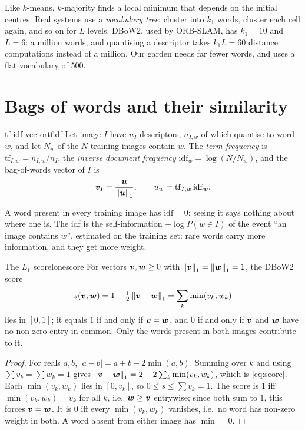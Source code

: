 Like $k$-means, $k$-majority finds a local minimum that depends on the
initial centres. Real systems use a \emph{vocabulary tree}: cluster
into $k_1$ words, cluster each cell again, and so on for $L$ levels.
DBoW2, used by ORB-SLAM, has $k_1=10$ and $L=6$: a million words, and
quantising a descriptor takes $k_1L=60$ distance computations instead
of a million. Our garden needs far fewer words, and 
uses a flat vocabulary of 500.

\section{Bags of words and their similarity}

\begin{definition}{tf-idf vector}{tfidf}
Let image $I$ have $n_I$ descriptors, $n_{I,w}$ of which quantise to
word $w$, and let $N_w$ of the $N$ training images contain $w$. The
\emph{term frequency} is $\mathrm{tf}_{I,w}=n_{I,w}/n_I$, the
\emph{inverse document frequency} $\mathrm{idf}_w=\log(N/N_w)$, and the
bag-of-words vector of $I$ is
\begin{equation}\label{eq:tfidf}
\bm{v}_I=\frac{\bm{u}}{\left\lVert \bm{u}\right\rVert_1},\qquad
u_w=\mathrm{tf}_{I,w}\,\mathrm{idf}_w .
\end{equation}
\end{definition}

A word present in every training image has $\mathrm{idf}=0$: seeing it
says nothing about where one is. The idf is the self-information
$-\log P(w\in I)$ of the event ``an image contains $w$'', estimated on
the training set: rare words carry more information, and they get more
weight.

\begin{proposition}{The $L_1$ score}{lonescore}
For vectors $\bm{v},\bm{w}\ge0$ with $\left\lVert \bm{v}\right\rVert_1=
\left\lVert \bm{w}\right\rVert_1=1$, the DBoW2 score
\begin{equation}\label{eq:score}
s(\bm{v},\bm{w})=1-\tfrac12\left\lVert \bm{v}-\bm{w}\right\rVert_1
=\sum_{k}\min(v_k,w_k)
\end{equation}
lies in $[0,1]$; it equals $1$ if and only if $\bm{v}=\bm{w}$, and
$0$ if and only if $\bm{v}$ and $\bm{w}$ have no non-zero entry in
common. Only the words present in both images contribute to it.
\end{proposition}

\begin{proof}
For reals $a,b$, $|a-b|=a+b-2\min(a,b)$. Summing over $k$ and using
$\sum v_k=\sum w_k=1$ gives $\left\lVert \bm{v}-\bm{w}\right\rVert_1=2-2\sum_k
\min(v_k,w_k)$, which is \eqref{eq:score}. Each $\min(v_k,w_k)$ lies in
$[0,v_k]$, so $0\le s\le\sum v_k=1$. The score
is $1$ iff $\min(v_k,w_k)=v_k$ for all $k$, i.e.\ $\bm{w}\ge\bm{v}$
entrywise; since both sum to $1$, this forces $\bm{v}=\bm{w}$. It is
$0$ iff every $\min(v_k,w_k)$ vanishes, i.e.\ no word has non-zero weight
in both. A word absent from either image has $\min=0$.
\end{proof}

